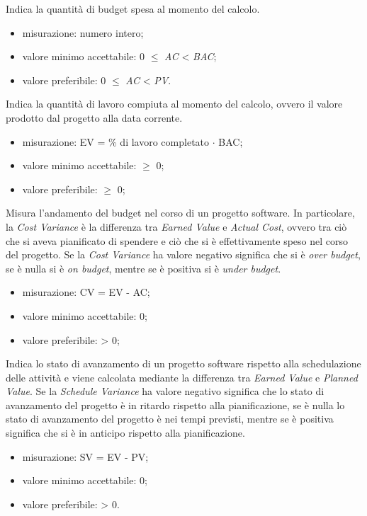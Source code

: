 		Indica la quantità di budget spesa al momento del calcolo.
		\begin{itemize}
			\item{misurazione: numero intero;}
			\item{valore minimo accettabile: 0 $\leq$ \textit{AC} < \textit{BAC};}
			\item{valore preferibile: 0 $\leq$ \textit{AC} < \textit{PV}.}
		\end{itemize}
		
		Indica la quantità di lavoro compiuta al momento del calcolo, ovvero il valore prodotto dal progetto alla data corrente.
		\begin{itemize}
			\item{misurazione: EV =  \% di lavoro completato $\cdot$ BAC;}
			\item{valore minimo accettabile: $\geq$ 0;}
			\item{valore preferibile: $\geq$ 0;}
		\end{itemize}

		Misura l'andamento del budget nel corso di un progetto software. In particolare, la \textit{Cost Variance} è la differenza tra \textit{Earned Value} e \textit{Actual Cost}, ovvero tra ciò che si aveva pianificato di spendere e ciò che si è effettivamente speso nel corso del progetto.
		Se la \textit{Cost Variance} ha valore negativo significa che si è \textit{over budget}, se è nulla si è \textit{on budget}, mentre se è positiva si è \textit{under budget}.
		\begin{itemize}
			\item{misurazione: CV = EV - AC;}
			\item{valore minimo accettabile: 0;}
			\item{valore preferibile: > 0;}
		\end{itemize}
		
		Indica lo stato di avanzamento di un progetto software rispetto alla schedulazione delle attività e viene calcolata mediante la differenza tra \textit{Earned Value} e \textit{Planned Value}.
		Se la \textit{Schedule Variance} ha valore negativo significa che lo stato di avanzamento del progetto è in ritardo rispetto alla pianificazione, se è nulla lo stato di avanzamento del progetto è nei tempi previsti, mentre se è positiva significa che si è in anticipo rispetto alla pianificazione.
		\begin{itemize}
			\item{misurazione: SV = EV - PV;}
			\item{valore minimo accettabile: 0;}
			\item{valore preferibile: > 0.}
		\end{itemize}
						

